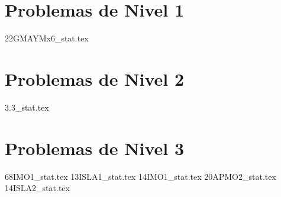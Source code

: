 \section{Problemas de Nivel 1}
{22GMAYMx6_stat.tex} %

\section{Problemas de Nivel 2}
{3.3_stat.tex} %

\section{Problemas de Nivel 3}
{68IMO1_stat.tex} %
{13ISLA1_stat.tex} %
{14IMO1_stat.tex} %
{20APMO2_stat.tex} %
{14ISLA2_stat.tex} %
